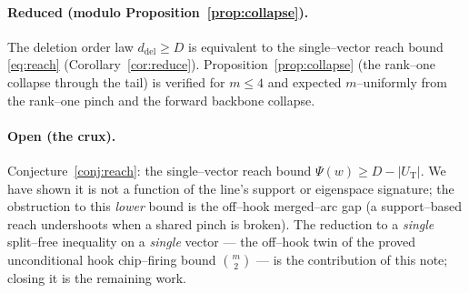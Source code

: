 \documentclass[11pt]{article}
\theoremstyle{definition}
\newcommand{\ddel}{d_{\mathrm{del}}}
\begin{document}
\paragraph{Reduced (modulo Proposition~\ref{prop:collapse}).}
The deletion order law $\ddel\ge D$ is equivalent to the single--vector reach bound
\eqref{eq:reach} (Corollary~\ref{cor:reduce}). Proposition~\ref{prop:collapse} (the rank--one
collapse through the tail) is verified for $m\le4$ and expected $m$--uniformly from the
rank--one pinch and the forward backbone collapse.

\paragraph{Open (the crux).}
Conjecture~\ref{conj:reach}: the single--vector reach bound $\Psi(w)\ge D-|U_{\mathrm T}|$. We
have shown it is not a function of the line's support or eigenspace signature; the obstruction to
this \emph{lower} bound is the off--hook merged--arc gap (a support--based reach undershoots when
a shared pinch is broken). The reduction to a \emph{single} split--free inequality on a
\emph{single} vector --- the off--hook twin of the proved unconditional hook chip--firing bound
$\binom m2$ --- is the contribution of this note; closing it is the remaining work.
\end{document}

